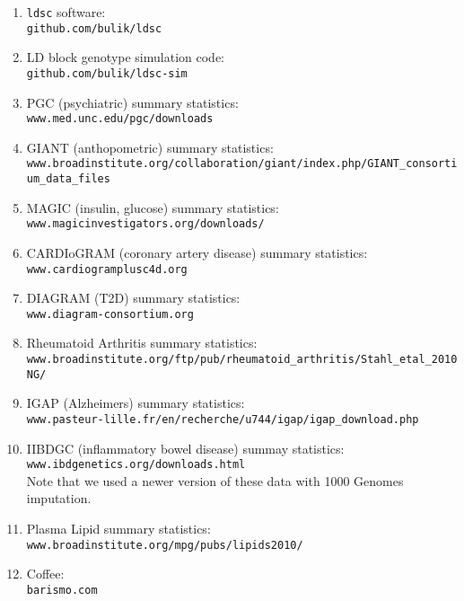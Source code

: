 \documentclass[11pt]{article}
\begin{document}
\begin{enumerate}
	\item \texttt{ldsc} software:\\ 
		\texttt{github.com/bulik/ldsc}
		
	\item LD block genotype simulation code:\\
		\texttt{github.com/bulik/ldsc-sim}
		
	\item PGC (psychiatric) summary statistics:\\ 
		\texttt{www.med.unc.edu/pgc/downloads}
		
	\item GIANT (anthopometric) summary statistics: \\
		\texttt{www.broadinstitute.org/collaboration/giant/index.php/GIANT\_consortium\_data\_files}
		
	\item MAGIC (insulin, glucose) summary statistics: \\
		\texttt{www.magicinvestigators.org/downloads/}
		
	\item CARDIoGRAM (coronary artery disease) summary statistics:\\	
		\texttt{www.cardiogramplusc4d.org}
	
	\item DIAGRAM (T2D) summary statistics:\\
		\texttt{www.diagram-consortium.org}
		
	\item Rheumatoid Arthritis summary statistics:\\
		\texttt{www.broadinstitute.org/ftp/pub/rheumatoid\_arthritis/Stahl\_etal\_2010NG/}
	
	\item IGAP (Alzheimers) summary statistics:\\
		\texttt{www.pasteur-lille.fr/en/recherche/u744/igap/igap\_download.php}

	\item IIBDGC (inflammatory bowel disease) summay statistics:\\
		\texttt{www.ibdgenetics.org/downloads.html}\\
		Note that we used a newer version of these data with 1000 Genomes imputation.

	\item Plasma Lipid summary statistics:\\
		\texttt{www.broadinstitute.org/mpg/pubs/lipids2010/}
	
	\item Coffee:\\
		\texttt{barismo.com}
\end{enumerate}
\end{document}
